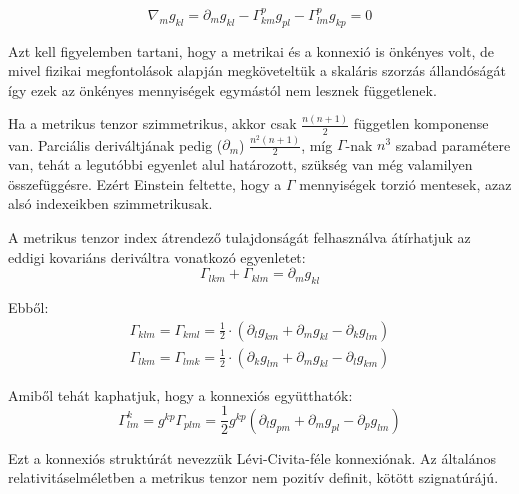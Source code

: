 \documentclass[a4paper,12pt]{article}
\begin{document}
\begin{equation*}
    \nabla_{m}g_{kl} = \partial_{m}g_{kl} - \Gamma_{km}^{p}g_{pl} - \Gamma_{lm}^{p}g_{kp} = 0
\end{equation*}
\par Azt kell figyelemben tartani, hogy a metrikai és a konnexió is önkényes volt, de mivel fizikai megfontolások alapján megköveteltük a skaláris szorzás állandóságát így ezek az önkényes mennyiségek egymástól nem lesznek függetlenek.
\par Ha a metrikus tenzor szimmetrikus, akkor csak $\frac{n(n+1)}{2}$ független komponense van. Parciális deriváltjának pedig ($\partial_{m}$) $\frac{n^{2}(n+1)}{2}$, míg $\Gamma$-nak $n^{3}$ szabad paramétere van, tehát a legutóbbi egyenlet alul határozott, szükség van még valamilyen összefüggésre. Ezért Einstein feltette, hogy a $\Gamma$ mennyiségek torzió mentesek, azaz alsó indexeikben szimmetrikusak.
\par A metrikus tenzor index átrendező tulajdonságát felhasználva átírhatjuk az eddigi kovariáns deriváltra vonatkozó egyenletet:
\begin{equation*}
    \Gamma_{lkm} + \Gamma_{klm} = \partial_{m}g_{kl}
\end{equation*}
\par Ebből:
\begin{gather*}
    \Gamma_{klm} = \Gamma_{kml} = \frac{1}{2}\cdot(\partial_{l}g_{km} + \partial_{m}g_{kl} - \partial_{k}g_{lm}) \\
    \Gamma_{lkm} = \Gamma_{lmk} = \frac{1}{2}\cdot(\partial_{k}g_{lm} + \partial_{m}g_{kl} - \partial_{l}g_{km})
\end{gather*}
\par Amiből tehát kaphatjuk, hogy a konnexiós együtthatók:
\begin{equation*}
    \Gamma_{lm}^{k} = g^{kp}\Gamma_{plm} = \frac{1}{2}g^{kp}(\partial_{l}g_{pm} + \partial_{m}g_{pl} - \partial_{p}g_{lm})
\end{equation*}
\par Ezt a konnexiós struktúrát nevezzük Lévi-Civita-féle konnexiónak. Az általános relativitáselméletben a metrikus tenzor nem pozitív definit, kötött szignatúrájú.
\end{document}
